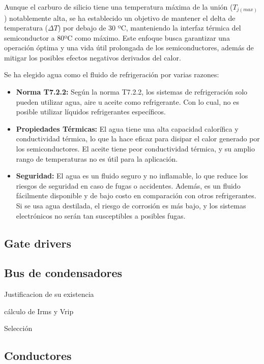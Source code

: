 Aunque el carburo de silicio tiene una temperatura máxima de la unión (\(T_{j(max)}\)) notablemente alta, se ha establecido un objetivo de mantener el delta de temperatura (\(\Delta T\)) por debajo de 30 ºC, manteniendo la interfaz térmica del semiconductor a 80ºC como máximo. Este enfoque busca garantizar una operación óptima y una vida útil prolongada de los semiconductores, además de mitigar los posibles efectos negativos derivados del calor.

Se ha elegido agua como el fluido de refrigeración por varias razones:

\begin{itemize}
	\item \textbf{Norma T7.2.2:} Según la norma T7.2.2, los sistemas de refrigeración solo pueden utilizar agua, aire u aceite como refrigerante. Con lo cual, no es posible utilizar líquidos refrigerantes específicos.
	
	\item \textbf{Propiedades Térmicas:} El agua tiene una alta capacidad calorífica y conductividad térmica, lo que la hace eficaz para disipar el calor generado por los semiconductores. El aceite tiene peor conductividad térmica, y su amplio rango de temperaturas no es útil para la aplicación.
	
	\item \textbf{Seguridad:} El agua es un fluido seguro y no inflamable, lo que reduce los riesgos de seguridad en caso de fugas o accidentes. Además, es un fluido fácilmente disponible y de bajo costo en comparación con otros refrigerantes. Si se usa agua destilada, el riesgo de corrosión es más bajo, y los sistemas electrónicos no serán tan susceptibles a posibles fugas.
	
\end{itemize}


\subsection{Gate drivers}



\subsection{Bus de condensadores}

Justificacion de su existencia

cálculo de Irms y Vrip

Selección

\subsection{Conductores}

